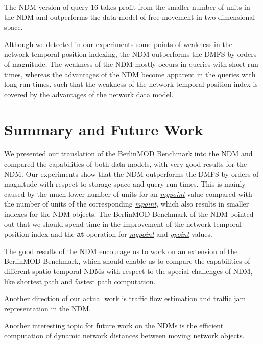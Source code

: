 \documentclass[a4paper]{article}
\newcommand{\bmodb} {BerlinMOD Benchmark}
\newcommand{\op}[1]{\textbf{#1}}
\newcommand{\dt}[1]{\textsl{\underline{#1}}}
\begin{document}
The NDM version of query 16 takes profit from the smaller number
of units in the NDM and outperforms the data model of free movement
in two dimensional space.

Although we detected in our experiments some points of weakness in the network-temporal
position indexing, the NDM outperforms the DMFS by orders of magnitude. The weakness
of the NDM mostly occurs in queries with short run times, whereas the advantages
of the NDM become apparent in the queries with long run times, such that the weakness
of the network-temporal position index is covered by the advantages of the network
data model.
\section{Summary and Future Work}
\label{sec:summary}
We presented our translation of the \bmodb{} into the NDM and
compared the capabilities of both data models, with very good results for the
NDM. Our experiments show that the NDM outperforms
the DMFS by orders of magnitude with respect to storage space and query run times.
This is mainly caused by the much lower number of units for an \dt{mgpoint} value
compared with the number of units of the corresponding \dt{mpoint}, which also
results in smaller indexes for the NDM objects. The \bmodb{} of the NDM pointed out
that we should spend time in the improvement of the network-temporal position index
and the \op{at} operation for \dt{mgpoint} and \dt{gpoint} values.

The good results of the NDM encourage us to work on an extension
of the \bmodb{}, which should enable us to compare the capabilities of different
spatio-temporal NDMs with respect to the special challenges of
NDM, like shortest path and fastest path computation.

Another direction of our actual work is traffic flow estimation and traffic jam
representation in the NDM.

Another interesting topic for future work on the NDMs is the efficient
computation of dynamic network distances between moving network objects.
{}

\appendix
\end{document}
